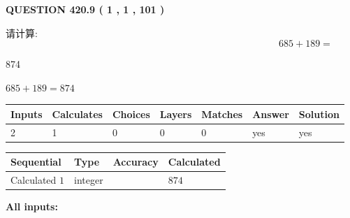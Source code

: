 \documentclass{ctexart}
\begin{document}
{\textbf{\Large{QUESTION
420.9 
 ( 1 , 1 , 101 )
}}}
  
  
 
请计算:
\begin{equation}
685 +  %
189 = \nonumber
\end{equation}
 
 
 
\noindent{}
 
 

874
 
 
\noindent{}
 
 

 
 
 
\noindent{}
 
 

$ %
685 +  %
189=   %
874$
 
 
\noindent{}
 
 

 
   
   
   
   
\noindent\begin{tabular}{|l|l|l|l|l|l|l|}
 \hline
Inputs & Calculates & Choices & Layers & Matches & Answer & Solution \\ \hline
 2  & 
 1  & 
 0
  & 
 0  & 
 0  & 
  yes & 
  yes 
  \\ \hline
 \end{tabular}
   
   
   
   
\noindent{}
   
   
  
  
\noindent\begin{tabular}{|l|l|l|l|}
\hline
 Sequential & Type & Accuracy & Calculated \\ 
\hline
 
 
  Calculated $  1 $ & integer &  & 
  $ 874 $ 
 \\  \hline  
 \end{tabular}
   
   
   
   
\noindent\vspace{0.1in}\hspace{-0.08in} {\textbf{\Large{All inputs: }}}
   
\end{document}
